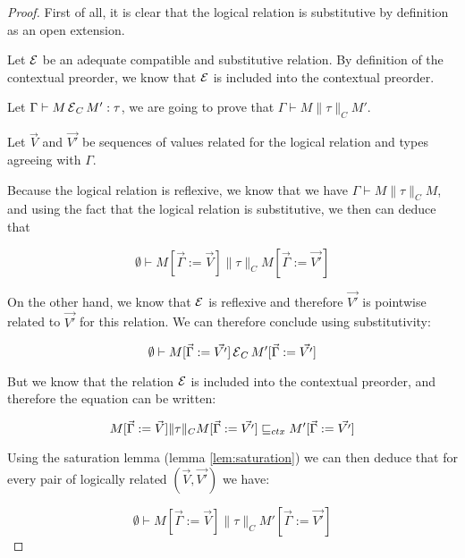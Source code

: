 \begin{proof}
    First of all, it is clear that the logical relation is substitutive 
    by definition as an open extension.

    Let $\operatorname{\mathcal{E}}$ be an adequate compatible and substitutive relation.
    By definition of the contextual preorder, we know that $\operatorname{\mathcal{E}}$
    is included into the contextual preorder. 

    Let $\Gamma \vdash M \operatorname{\mathcal{E}}_C M' : \tau$, we are going 
    to prove that $\Gamma \vdash M \| \tau \|_C M'$. 
    
    Let $\vec{V}$ and $\vec{V'}$ be
    sequences of values related for the logical relation and
    types agreeing with $\Gamma$. 

    Because the logical relation is reflexive, we know that 
    we have $\Gamma \vdash M \| \tau \|_C M$, and using the
    fact that the logical relation is substitutive, we then 
    can deduce that

    \begin{equation*}
        \emptyset \vdash M[\vec{\Gamma} := \vec{V}] \| \tau \|_C 
                         M[\vec{\Gamma} := \vec{V'}]
    \end{equation*}
    
    On the other hand, we know that $\operatorname{\mathcal{E}}$ is reflexive 
    and therefore $\vec{V'}$ is pointwise related 
    to $\vec{V'}$ for this relation. We can therefore 
    conclude using substitutivity:

    \begin{equation*}
        \emptyset \vdash M[\vec{\Gamma} := \vec{V'}] 
        \operatorname{\mathcal{E}}_C
                         M'[\vec{\Gamma} := \vec{V'}]
    \end{equation*}

    But we know that the relation $\operatorname{\mathcal{E}}$ is included into 
    the contextual preorder, and therefore the 
    equation can be written:

    \begin{equation*}
        M[\vec{\Gamma} := \vec{V}] 
        \| \tau \|_C
        M[\vec{\Gamma} := \vec{V'}]
        \sqsubseteq_{ctx}
        M'[\vec{\Gamma} := \vec{V'}]
    \end{equation*}

    Using the saturation lemma (lemma \ref{lem:saturation})
    we can then deduce that for every pair of
    logically related $(\vec{V},\vec{V'})$ we have:

    \begin{equation*}
        \emptyset \vdash M[\vec{\Gamma} := \vec{V}] \| \tau \|_C
        M'[\vec{\Gamma} := \vec{V'}] 
    \end{equation*}


\end{proof}
